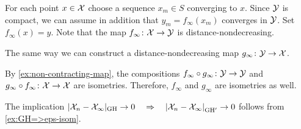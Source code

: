 For each point $x\in\mathcal{X}$ choose a sequence $x_m\in S$ converging to $x$.
Since $\mathcal{Y}$ is compact, we can assume in addition that $y_m=f_\infty(x_m)$ converges in $\mathcal{Y}$.
Set $f_\infty(x)=y$.
Note that the map $f_\infty\colon\mathcal{X}\to \mathcal{Y}$ is  distance-nondecreasing.

The same way we can construct a distance-nondecreasing map 
$g_\infty\colon\mathcal{Y}\to \mathcal{X}$.

By \ref{ex:non-contracting-map}, the compositions $f_\infty\circ g_\infty\colon\mathcal{Y}\to \mathcal{Y}$ and $g_\infty\z\circ f_\infty\:\spc{X}\to \spc{X}$ are isometries.
Therefore, $f_\infty$ and $g_\infty$ are isometries as well.

 The implication $|\spc{X}_n-\spc{X}_\infty|_{\GH}\to 0 
\quad\Rightarrow\quad 
\dist{\spc{X}_n}{\spc{X}_\infty}{\GH'}\to 0$ follows from \ref{ex:GH=>eps-isom}.

